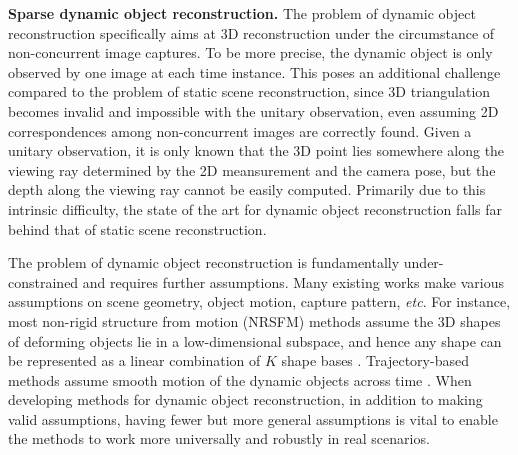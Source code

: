 \textbf{Sparse dynamic object reconstruction.}
The problem of dynamic object reconstruction specifically aims at 3D reconstruction under the circumstance of non-concurrent image captures. To be more precise, the dynamic object is only observed by one image at each time instance. This poses an additional challenge compared to the problem of static  scene reconstruction, since 3D triangulation becomes invalid and impossible with the unitary observation, even assuming 2D correspondences among non-concurrent images are correctly found. Given a unitary observation, it is only known that the 3D point lies somewhere along the viewing ray determined by the 2D meansurement and the camera pose, but the depth along the viewing ray cannot be easily computed. Primarily due to this intrinsic difficulty, the state of the art for dynamic object reconstruction falls far behind that of static scene reconstruction.

The problem of dynamic object reconstruction is fundamentally under-constrained and requires further assumptions. Many existing works make various assumptions on scene geometry, object motion, capture pattern, \emph{etc}. For instance, most non-rigid structure from motion (NRSFM) methods assume the 3D shapes of deforming objects lie in a low-dimensional subspace, and hence any shape can be represented as a linear combination of $K$ shape bases \cite{Bregler_CVPR2000,torresani2008nonrigid,dai2014simple}. Trajectory-based methods assume smooth motion of the dynamic objects across time \cite{Akhter_NIPS08}.
When developing methods for dynamic object reconstruction, in addition to making valid assumptions, having fewer but more general assumptions is vital to enable the methods to work more universally and robustly in real scenarios. 

